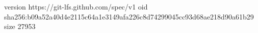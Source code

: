version https://git-lfs.github.com/spec/v1
oid sha256:b09a52a40d4e2115c64a1e3149afa226c8d74299045cc93d68ae218d90a61b29
size 27953
